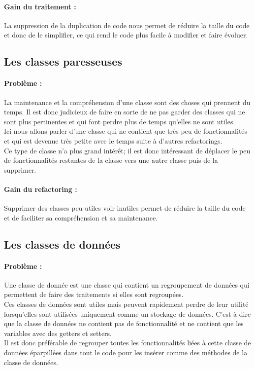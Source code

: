 \documentclass[a4paper,twoside,12pt,openright]{report}
\begin{document}
\paragraph{Gain du traitement :}
La suppression de la duplication de code nous permet de réduire la taille du code et donc de le simplifier, ce qui rend le code plus facile à modifier et faire évoluer.\\

\subsection{Les classes paresseuses}
\paragraph{Problème :}
La maintenance et la compréhension d'une classe sont des choses qui prennent du temps. Il est donc judicieux de faire en sorte de ne pas garder des classes qui ne sont plus pertinentes et qui font perdre plus de temps qu'elles ne sont utiles.\\
Ici nous allons parler d'une classe qui ne contient que très peu de fonctionnalités et qui est devenue très petite avec le temps suite à d'autres refactorings.\\


Ce type de classe n'a plus grand intérêt; il est donc intéressant de déplacer le peu de fonctionnalités restantes de la classe vers une autre classe puis de la supprimer.\\

\paragraph{Gain du refactoring :}
Supprimer des classes peu utiles voir inutiles permet de réduire la taille du code et de faciliter sa compréhension et sa maintenance.\\

\subsection{Les classes de données}
\paragraph{Problème :}
Une classe de donnée est une classe qui contient un regroupement de données qui permettent de faire des traitements si elles sont regroupées.\\
Ces classes de données sont utiles mais peuvent rapidement perdre de leur utilité lorsqu'elles sont utilisées uniquement comme un stockage de données. C'est à dire que la classe de données ne contient pas de fonctionnalité et ne contient que les variables avec des getters et setters.\\
Il est donc préférable de regrouper toutes les fonctionnalités liées à cette classe de données éparpillées dans tout le code pour les insérer comme des méthodes de la classe de données.\\ 
\end{document}
